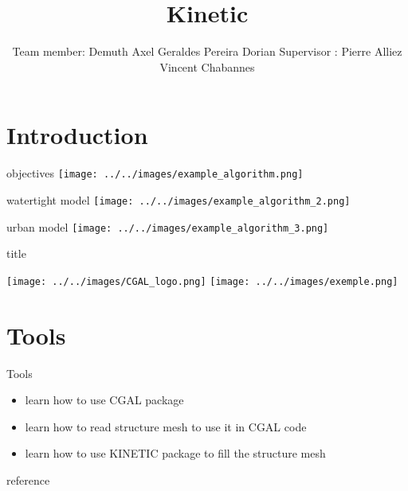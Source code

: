 \documentclass[10pt]{beamer}
\title{Kinetic}
\author{Team member: \newline\newline Demuth Axel \newline Geraldes Pereira Dorian \newline\newline Supervisor :  \newline\newline Pierre Alliez \newline Vincent Chabannes}
\date{}
\begin{document}
\frame{\titlepage}
\begin{frame}
    \tableofcontents
\end{frame}
\section{Introduction}


\begin{frame}[plain]{objectives}
    \texttt{[image: ../../images/example\_algorithm.png]}
\end{frame}

\begin{frame}[plain]{watertight model}
    \texttt{[image: ../../images/example\_algorithm\_2.png]}
\end{frame}
\begin{frame}[plain]{urban model}
    \texttt{[image: ../../images/example\_algorithm\_3.png]}
\end{frame}
\begin{frame}{title}
    
    \texttt{[image: ../../images/CGAL\_logo.png]}
    \texttt{[image: ../../images/exemple.png]}

\end{frame}

\section{Tools}

\begin{frame}[plain]{Tools}
    \begin{itemize}
        \item learn how to use CGAL package
        \item learn how to read structure mesh to use it in CGAL code
        \item learn how to use KINETIC package to fill the structure mesh  
    \end{itemize}
\end{frame}
\begin{frame}{reference}
    \nocite{*}
    
    
\end{frame}
\end{document}
